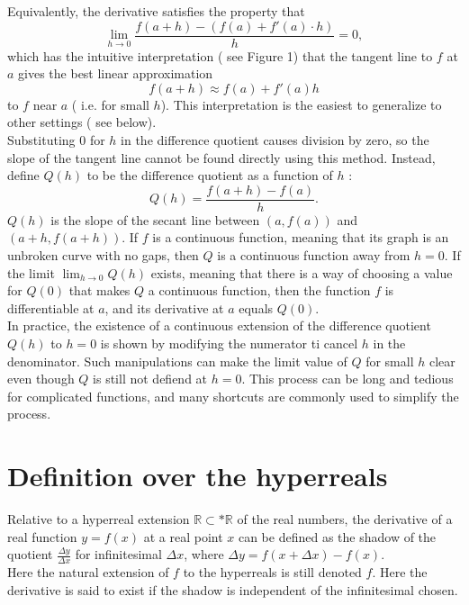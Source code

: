 Equivalently, the derivative satisfies the property that
\[ 
	\lim_{h \to 0} \frac{f(a+h) - ( f(a) + f'(a)\cdot h)}{h} = 0,
\]
which has the intuitive interpretation ( see Figure 1) that the tangent line to $f$ at $a$ gives the best linear approximation
\[ 
	f(a+h) \approx f(a) + f'(a)h
\]
to $f$ near $a$ ( i.e. for small $h$). This interpretation is the easiest to generalize to other settings ( see below).\\
Substituting $0$ for $h$ in the difference quotient causes division by zero, so the slope of the tangent line cannot be found directly using this method. Instead, define $Q(h)$ to be the difference quotient as a function of $h$ :
\[ 
	Q(h) = \frac{f(a+h) - f(a)}{h}.
\]
$Q(h)$ is the slope of the secant line between $(a,f(a))$ and $(a+h,f(a+h))$. If $f$ is a continuous function, meaning that its graph is an unbroken curve with no gaps, then $Q$ is a continuous function away from $h=0$. If the limit $\lim_{h \to 0} Q(h)$ exists, meaning that there is a way of choosing a value for $Q(0)$ that makes $Q$ a continuous function, then the function $f$ is differentiable at $a$, and its derivative at $a$ equals $Q(0)$.\\

In practice, the existence of a continuous extension of the difference quotient $Q(h)$ to $h=0$ is shown by modifying  the numerator ti cancel $h$ in the denominator. Such manipulations can make the limit value of $Q$ for small $h$ clear even though $Q$ is still not defiend at $h=0$. This process can be long and tedious for complicated functions, and many shortcuts are commonly used to simplify the process.

\section{Definition over the hyperreals}
Relative to a hyperreal extension $\mathbb{R} \subset *\mathbb{R}$ of the real numbers, the derivative of a real function $y=f(x)$ at a real point $x$ can be defined as the shadow of the quotient $\frac{\Delta y}{\Delta x}$ for infinitesimal $\Delta x$, where $\Delta y = f(x+\Delta x) - f(x)$.\\
Here the natural extension of $f$ to the hyperreals is still denoted $f$. Here the derivative is said to exist if the shadow is independent of the infinitesimal chosen.
